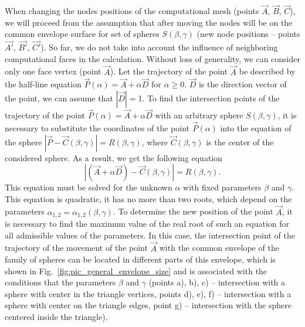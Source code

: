 \documentclass[
11pt,
tightenlines,
twoside,
onecolumn,
nofloats,
nobibnotes,
nofootinbib,
superscriptaddress,
noshowpacs,
centertags]
{revtex4}
\begin{document}
When changing the nodes positions of the computational  mesh (points
$\vec{A}$, $\vec{B}$, $\vec{C}$), we will proceed from the
assumption that after moving the nodes will be on the common
envelope surface for set of spheres $ S(\beta, \gamma)$ (new node
positions -- points $\vec{A'}$, $\vec{B'}$, $\vec{C'}$).
So far, we do not take into account the influence of neighboring
computational faces in the calculation.
Without loss of generality, we can consider only one face vertex (point $\vec{A}$).
Let the trajectory of the point $\vec{A}$ be described by the
half-line equation $\vec{P}(\alpha) = \vec{A} + \alpha \vec{D}$ for
$\alpha \ge 0$.
$\vec{D}$ is the direction vector of the point, we can assume  that
$|\vec{D}| = $1.
To find the intersection points of the trajectory of the point
$\vec{P}(\alpha) = \vec{A} + \alpha \vec{D}$ with an arbitrary
sphere $S(\beta, \gamma)$, it is necessary to substitute the
coordinates of the point $\vec{P}(\alpha)$ into the equation of the
sphere $|\vec{P} - \vec{C}(\beta, \gamma)| = R(\beta, \gamma)$,
where $\vec{C}(\beta, \gamma)$ is the center of the considered
sphere.
As a result, we get the following equation
\begin{equation}\label{eqn:intersect}
|(\vec{A} + \alpha \vec{D}) - \vec{C}(\beta, \gamma)| = R(\beta,
\gamma).
\end{equation}
This equation must be solved for the unknown $\alpha$ with fixed parameters $\beta$ and $\gamma$.
This equation is quadratic, it has no more than two roots, which depend on the parameters $\alpha_{1,2} = \alpha_{1,2}(\beta, \gamma)$.
To determine the new position of the point $\vec{A}$, it is necessary to find the maximum value of the real root of such an equation for all admissible values of the parameters.
In this case, the intersection point of the trajectory of the
movement of the point  $\vec{A}$ with the common envelope of the
family of spheres can be located in different parts of this
envelope, which is shown in Fig.~\ref{fig:pic_general_envelope_size}
and is associated with the conditions that the parameters $\beta$
and $\gamma$ (points a), b), c) -- intersection with a sphere with
center in the triangle vertices, points d), e), f) -- intersection
with a sphere with center on the triangle edges, point g) --
intersection with the sphere centered inside the triangle).
\end{document}
